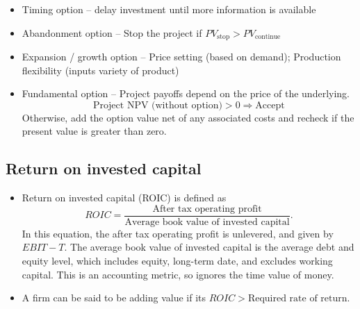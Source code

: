 \documentclass[../notes_compiled.tex]{subfiles}
\begin{document}
\begin{itemize}
\begin{itemize}
\item Timing option -- delay investment until more information is available
\item Abandonment option -- Stop the project if $PV_{\text{stop}}>PV_{\text{continue}}$
\item Expansion / growth option -- Price setting (based on demand); Production flexibility (inputs variety of product)
\item Fundamental option -- Project payoffs depend on the price of the underlying.
\begin{equation*}
\text{Project NPV (without option)} >0\Rightarrow\text{Accept}
\end{equation*}
Otherwise, add the option value net of any associated costs and recheck if the present value is greater than zero.
\end{itemize}
\end{itemize}

\subsection{Return on invested capital}
\begin{itemize}
\item Return on invested capital (ROIC) is defined as
\begin{equation}
ROIC = \frac{\text{After tax operating profit}}{\text{Average book value of invested capital}}.
\end{equation}
In this equation, the after tax operating profit is unlevered, and given by $EBIT-T$. The average book value of invested capital is the average debt and equity level, which includes equity, long-term date, and excludes working capital. This is an accounting metric, so ignores the time value of money.
\item A firm can be said to be adding value if its $ROIC>\text{Required rate of return}$.
\end{itemize}
\end{document}
